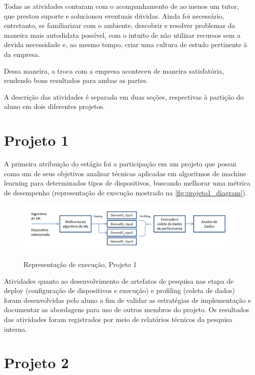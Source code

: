\documentclass[
	12pt,				%
    oneside,			%
	a4paper,			%
	english,			%
	french,				%
	spanish,			%
	brazil				%
	]{abntex2}
\begin{document}
Todas as atividades contaram com o acompanhamento de ao menos um tutor, que prestou suporte e solucionou eventuais dúvidas. Ainda foi necessário, entretanto, se familiarizar com o ambiente, descobrir e resolver problemas da maneira mais autodidata possível, com o intuito de não utilizar recursos sem a devida necessidade e, ao mesmo tempo, criar uma cultura de estudo pertinente à da empresa. 

Dessa maneira, a troca com a empresa aconteceu de maneira satisfatória, rendendo bons resultados para ambas as partes.

A descrição das atividades é separada em duas seções, respectivas à partição do aluno em dois diferentes projetos.

\section{Projeto 1}

A primeira atribuição do estágio foi a participação em um projeto que possui como um de seus objetivos analisar técnicas aplicadas em algoritmos de machine learning para determinados tipos de dispositivos, buscando melhorar uma métrica de desempenho (representação de execução mostrado na \autoref{fig:projeto1_diagram}).

\begin{figure}[H] 
  \centering
  \includegraphics[width=450pt]{images/projeto1_diagram.png}\\
  \caption[Representação de execução, Projeto 1]{Representação de execução, Projeto 1}  \label{fig:projeto1_diagram}
\end{figure}

Atividades quanto ao desenvolvimento de artefatos de pesquisa nas etapa de deploy (configuração de dispositivos e execução) e profiling (coleta de dados) foram desenvolvidas pelo aluno a fim de validar as estratégias de implementação e documentar as abordagens para uso de outros membros do projeto. Os resultados das atividades foram registrados por meio de relatórios técnicos da pesquisa interna.

\section{Projeto 2}
\end{document}
